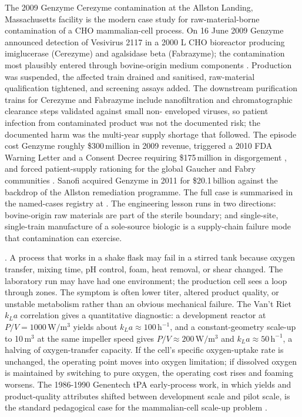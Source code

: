 The 2009 Genzyme Cerezyme contamination at the Allston Landing,
Massachusetts facility is the modern case study for raw-material-borne
contamination of a CHO mammalian-cell process. On 16 June 2009 Genzyme
announced detection of Vesivirus 2117 in a 2000 L CHO bioreactor
producing imiglucerase (Cerezyme) and agalsidase beta (Fabrazyme); the
contamination most plausibly entered through bovine-origin medium
components \cite{paper:v6c10-vesivirus-2117-victoria-2006}. Production
was suspended, the affected train drained and sanitised, raw-material
qualification tightened, and screening assays added. The downstream
purification trains for Cerezyme and Fabrazyme include nanofiltration
and chromatographic clearance steps validated against small non-
enveloped viruses, so patient infection from contaminated product was
not the documented risk; the documented harm was the multi-year supply
shortage that followed. The episode cost Genzyme roughly
\$300\,million in 2009 revenue, triggered a 2010 FDA Warning Letter and
a Consent Decree requiring \$175\,million in disgorgement
\cite{web:v6c10-genzyme-sec-8k-2009-06,
web:v6c10-fda-warning-letter-genzyme-2010,
web:v6c10-fda-consent-decree-genzyme-2010}, and forced patient-supply
rationing for the global Gaucher and Fabry communities
\cite{paper:v6c10-genzyme-shortage-2010}. Sanofi acquired Genzyme in
2011 for \$20.1\,billion against the backdrop of the Allston
remediation programme. The full case is summarised in the named-cases
registry at
\cite{acc:genzyme-cerezyme-2009}.
The engineering lesson runs in two directions: bovine-origin raw
materials are part of the sterile boundary; and single-site,
single-train manufacture of a sole-source biologic is a supply-chain
failure mode that contamination can exercise.

. A process that works in a shake flask may fail
in a stirred tank because oxygen transfer, mixing time, pH control,
foam, heat removal, or shear changed. The laboratory run may have had
one environment; the production cell sees a loop through zones. The
symptom is often lower titer, altered product quality, or unstable
metabolism rather than an obvious mechanical failure. The Van't Riet
$k_L a$ correlation gives a quantitative diagnostic: a development
reactor at $P/V = 1000\,\text{W}/\text{m}^3$ yields about
$k_L a \approx 100\,\text{h}^{-1}$, and a constant-geometry scale-up to
10\,m$^3$ at the same impeller speed gives $P/V \approx 200\,\text{W}/\text{m}^3$
and $k_L a \approx 50\,\text{h}^{-1}$, a halving of oxygen-transfer
capacity. If the cell's specific oxygen-uptake rate is unchanged, the
operating point moves into oxygen limitation; if dissolved oxygen is
maintained by switching to pure oxygen, the operating cost rises and
foaming worsens. The 1986-1990 Genentech tPA early-process work, in
which yields and product-quality attributes shifted between
development scale and pilot scale, is the standard pedagogical case
for the mammalian-cell scale-up problem
\cite{paper:v6c10-li-cho-cellline-2010}.

